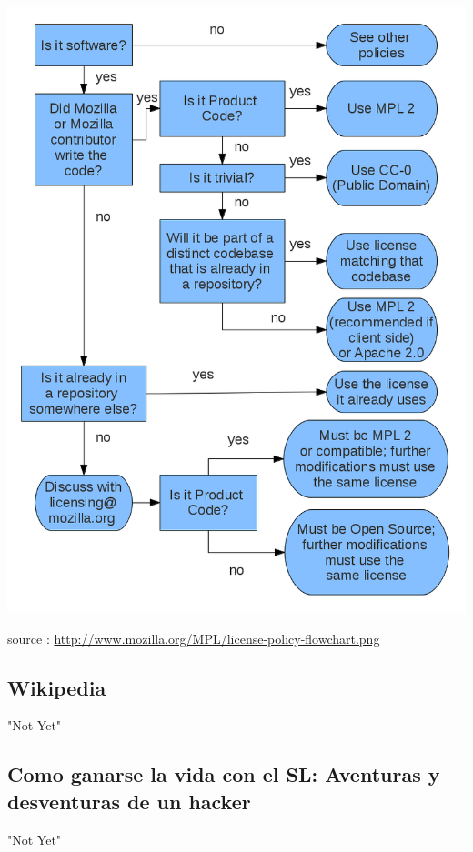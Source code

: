 \documentclass[11pt]{article} %
\begin{document}
\centerline{\includegraphics[scale=0.3]{chart}}
\centerline \small    source : \url {http://www.mozilla.org/MPL/license-policy-flowchart.png}



\subsection{Wikipedia} %
"Not Yet" \\


\subsection {Como ganarse la vida con el SL: Aventuras y desventuras de un hacker}
"Not Yet" \\


\newpage
\end{document}
